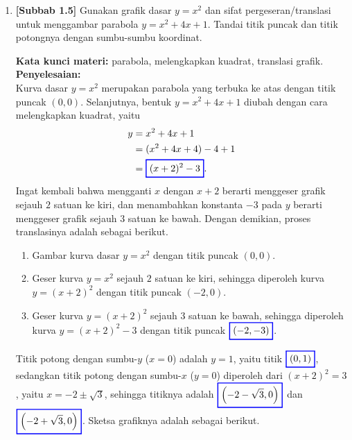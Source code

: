 \documentclass[10pt,openany,a4paper]{article}
\theoremstyle{definition}
\theoremstyle{definition}
\theoremstyle{plain}
\newenvironment{jawab}[2][tes]{%
\par\noindent\textbf{Kata kunci materi:} #1.\\
\textbf{Penyelesaian:} #2%
}{}
\begin{document}
\begin{enumerate}
    \item \textbf{[Subbab 1.5]} Gunakan grafik dasar $y=x^2$ dan sifat pergeseran/translasi untuk menggambar parabola $y=x^2+4x+1$. Tandai titik puncak dan titik potongnya dengan sumbu-sumbu koordinat.
    \begin{jawab}[parabola, melengkapkan kuadrat, translasi grafik]{~\\
        Kurva dasar $y=x^2$ merupakan parabola yang terbuka ke atas dengan titik puncak $(0,0)$. Selanjutnya, bentuk $y=x^2+4x+1$ diubah dengan cara melengkapkan kuadrat, yaitu
        \begin{align*}
            y &= x^2+4x+1\\
            &= (x^2+4x+4)-4+1\\
            &= \colorlet{oldcolor}{.}
        \color{blue}
        \setlength{\fboxrule}{1pt} \boxed{\color{oldcolor}(x+2)^2-3}\color{oldcolor}.
        \end{align*}
        Ingat kembali bahwa mengganti $x$ dengan $x+2$ berarti menggeser grafik sejauh $2$ satuan ke kiri, dan menambahkan konstanta $-3$ pada $y$ berarti menggeser grafik sejauh $3$ satuan ke bawah. Dengan demikian, proses translasinya adalah sebagai berikut.
        \begin{enumerate}
            \item[(i)] Gambar kurva dasar $y=x^2$ dengan titik puncak $(0,0)$.
            \item[(ii)] Geser kurva $y=x^2$ sejauh $2$ satuan ke kiri, sehingga diperoleh kurva $y=(x+2)^2$ dengan titik puncak $(-2,0)$.
            \item[(iii)] Geser kurva $y=(x+2)^2$ sejauh $3$ satuan ke bawah, sehingga diperoleh kurva $y=(x+2)^2-3$ dengan titik puncak $\colorlet{oldcolor}{.}
        \color{blue}
        \setlength{\fboxrule}{1pt} \boxed{\color{oldcolor}(-2,-3)}\color{oldcolor}$.
        \end{enumerate}
        Titik potong dengan sumbu-$y$ ($x=0$) adalah $y=1$, yaitu titik $\colorlet{oldcolor}{.}
        \color{blue}
        \setlength{\fboxrule}{1pt} \boxed{\color{oldcolor}(0,1)}\color{oldcolor}$, sedangkan titik potong dengan sumbu-$x$ ($y=0$) diperoleh dari $(x+2)^2=3$, yaitu $x=-2\pm\sqrt{3}$, sehingga titiknya adalah $\colorlet{oldcolor}{.}
        \color{blue}
        \setlength{\fboxrule}{1pt} \boxed{\color{oldcolor}\left(-2-\sqrt{3},0\right)}\color{oldcolor}$ dan $\colorlet{oldcolor}{.}
        \color{blue}
        \setlength{\fboxrule}{1pt} \boxed{\color{oldcolor}\left(-2+\sqrt{3},0\right)}\color{oldcolor}$. Sketsa grafiknya adalah sebagai berikut.
}
\end{jawab}
\end{enumerate}
\end{document}
